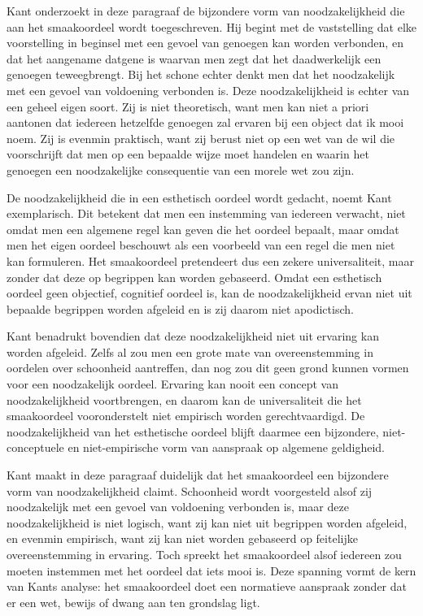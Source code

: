 \begin{mdframed}[leftmargin=0pt,rightmargin=0pt,backgroundcolor=blue!6,linecolor=white,innertopmargin=6pt,innerbottommargin=6pt]
Kant onderzoekt in deze paragraaf de bijzondere vorm van noodzakelijkheid die aan het smaakoordeel wordt toegeschreven. Hij begint met de vaststelling dat elke voorstelling in beginsel met een gevoel van genoegen kan worden verbonden, en dat het aangename datgene is waarvan men zegt dat het daadwerkelijk een genoegen teweegbrengt. Bij het schone echter denkt men dat het noodzakelijk met een gevoel van voldoening verbonden is. Deze noodzakelijkheid is echter van een geheel eigen soort. Zij is niet theoretisch, want men kan niet a priori aantonen dat iedereen hetzelfde genoegen zal ervaren bij een object dat ik mooi noem. Zij is evenmin praktisch, want zij berust niet op een wet van de wil die voorschrijft dat men op een bepaalde wijze moet handelen en waarin het genoegen een noodzakelijke consequentie van een morele wet zou zijn.

De noodzakelijkheid die in een esthetisch oordeel wordt gedacht, noemt Kant exemplarisch. Dit betekent dat men een instemming van iedereen verwacht, niet omdat men een algemene regel kan geven die het oordeel bepaalt, maar omdat men het eigen oordeel beschouwt als een voorbeeld van een regel die men niet kan formuleren. Het smaakoordeel pretendeert dus een zekere universaliteit, maar zonder dat deze op begrippen kan worden gebaseerd. Omdat een esthetisch oordeel geen objectief, cognitief oordeel is, kan de noodzakelijkheid ervan niet uit bepaalde begrippen worden afgeleid en is zij daarom niet apodictisch.

Kant benadrukt bovendien dat deze noodzakelijkheid niet uit ervaring kan worden afgeleid. Zelfs al zou men een grote mate van overeenstemming in oordelen over schoonheid aantreffen, dan nog zou dit geen grond kunnen vormen voor een noodzakelijk oordeel. Ervaring kan nooit een concept van noodzakelijkheid voortbrengen, en daarom kan de universaliteit die het smaakoordeel vooronderstelt niet empirisch worden gerechtvaardigd. De noodzakelijkheid van het esthetische oordeel blijft daarmee een bijzondere, niet-conceptuele en niet-empirische vorm van aanspraak op algemene geldigheid.

\bigskip
Kant maakt in deze paragraaf duidelijk dat het smaakoordeel een bijzondere vorm van noodzakelijkheid claimt. Schoonheid wordt voorgesteld alsof zij noodzakelijk met een gevoel van voldoening verbonden is, maar deze noodzakelijkheid is niet logisch, want zij kan niet uit begrippen worden afgeleid, en evenmin empirisch, want zij kan niet worden gebaseerd op feitelijke overeenstemming in ervaring. Toch spreekt het smaakoordeel alsof iedereen zou moeten instemmen met het oordeel dat iets mooi is. Deze spanning vormt de kern van Kants analyse: het smaakoordeel doet een normatieve aanspraak zonder dat er een wet, bewijs of dwang aan ten grondslag ligt.


\end{mdframed}

